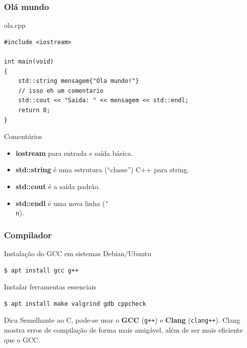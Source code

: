 \documentclass[xcolor={usenames,dvipsnames},10pt,presentation,aspectratio=169]{beamer}
\begin{document}
\begin{frame}[fragile]
  \frametitle{Olá mundo}
  \vspace{-2mm}
  \begin{block}{ola.cpp}
\begin{lstlisting}
#include <iostream>

int main(void)
{
    std::string mensagem{"Ola mundo!"}
    // isso eh um comentario
    std::cout << "Saida: " << mensagem << std::endl;
    return 0;
}
\end{lstlisting}
\end{block}
%
\begin{exampleblock}{Comentários}
\begin{itemize}
\item \textbf{iostream} para entrada e saída básica.
\item \textbf{std::string} é uma estrutura (``classe'') C++ para string.
\item \textbf{std::cout} é a saída padrão.
\item \textbf{std::endl} é uma nova linha (\texttt{\char`\\n}).
\end{itemize}
\end{exampleblock}
%
\end{frame}
\begin{frame}[fragile]
  \frametitle{Compilador}
\begin{exampleblock}{Instalação do GCC em sistemas Debian/Ubuntu}
\begin{lstlisting}
$ apt install gcc g++
\end{lstlisting}
\end{exampleblock}
%
\begin{exampleblock}{Instalar ferramentas essenciais}
\begin{lstlisting}
$ apt install make valgrind gdb cppcheck 
\end{lstlisting}
\end{exampleblock}
%
\begin{alertblock}{Dica}
Semelhante ao C, pode-se usar o \textbf{GCC} (\texttt{g++}) e \textbf{Clang}
(\texttt{clang++}).
Clang mostra erros de compilação de forma mais amigável, além de ser mais 
eficiente que o GCC.
\end{alertblock}
\end{frame}
\end{document}
